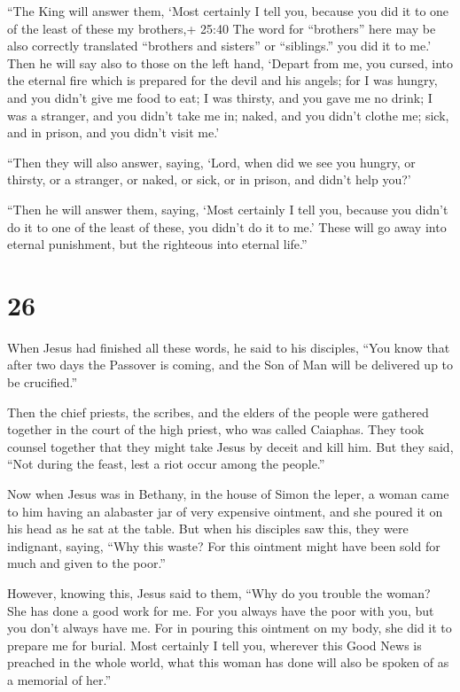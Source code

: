  ``The King will answer them, `Most certainly I tell you,
because you did it to one of the least of these my brothers,+ 25:40 The
word for ``brothers'' here may be also correctly translated ``brothers
and sisters'' or ``siblings.'' you did it to me.'  Then he
will say also to those on the left hand, `Depart from me, you cursed,
into the eternal fire which is prepared for the devil and his angels;
 for I was hungry, and you didn't give me food to eat; I
was thirsty, and you gave me no drink;  I was a stranger,
and you didn't take me in; naked, and you didn't clothe me; sick, and in
prison, and you didn't visit me.'

 ``Then they will also answer, saying, `Lord, when did we
see you hungry, or thirsty, or a stranger, or naked, or sick, or in
prison, and didn't help you?'

 ``Then he will answer them, saying, `Most certainly I tell
you, because you didn't do it to one of the least of these, you didn't
do it to me.'  These will go away into eternal punishment,
but the righteous into eternal life.''

\hypertarget{section-25}{%
\section{26}\label{section-25}}

 When Jesus had finished all these words, he said to his
disciples,  ``You know that after two days the Passover is
coming, and the Son of Man will be delivered up to be crucified.''

 Then the chief priests, the scribes, and the elders of the
people were gathered together in the court of the high priest, who was
called Caiaphas.  They took counsel together that they might
take Jesus by deceit and kill him.  But they said, ``Not
during the feast, lest a riot occur among the people.''

 Now when Jesus was in Bethany, in the house of Simon the
leper,  a woman came to him having an alabaster jar of very
expensive ointment, and she poured it on his head as he sat at the
table.  But when his disciples saw this, they were
indignant, saying, ``Why this waste?  For this ointment
might have been sold for much and given to the poor.''

 However, knowing this, Jesus said to them, ``Why do you
trouble the woman? She has done a good work for me.  For
you always have the poor with you, but you don't always have me.
 For in pouring this ointment on my body, she did it to
prepare me for burial.  Most certainly I tell you, wherever
this Good News is preached in the whole world, what this woman has done
will also be spoken of as a memorial of her.''


